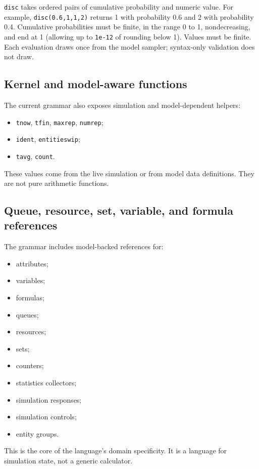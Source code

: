 \texttt{disc} takes ordered pairs of cumulative probability and numeric value.
For example, \texttt{disc(0.6,1,1,2)} returns 1 with probability 0.6 and 2
with probability 0.4. Cumulative probabilities must be finite, in the range
0 to 1, nondecreasing, and end at 1 (allowing up to \texttt{1e-12} of
rounding below 1). Values must be finite. Each evaluation draws once from
the model sampler; syntax-only validation does not draw.

\subsection{Kernel and model-aware functions}
\label{subsec:expression-reference-kernel}

The current grammar also exposes simulation and model-dependent helpers:
\begin{itemize}
\item \texttt{tnow}, \texttt{tfin}, \texttt{maxrep}, \texttt{numrep};
\item \texttt{ident}, \texttt{entitieswip};
\item \texttt{tavg}, \texttt{count}.
\end{itemize}

These values come from the live simulation or from model data definitions.
They are not pure arithmetic functions.

\subsection{Queue, resource, set, variable, and formula references}
\label{subsec:expression-reference-model-symbols}

The grammar includes model-backed references for:
\begin{itemize}
\item attributes;
\item variables;
\item formulas;
\item queues;
\item resources;
\item sets;
\item counters;
\item statistics collectors;
\item simulation responses;
\item simulation controls;
\item entity groups.
\end{itemize}

This is the core of the language's domain specificity. It is a language for
simulation state, not a generic calculator.

